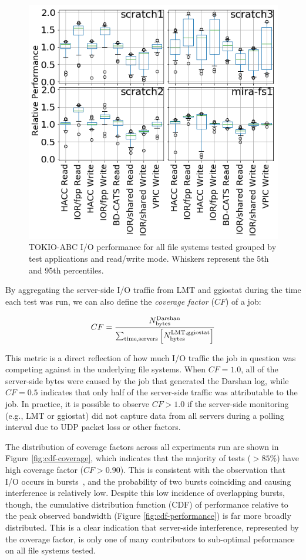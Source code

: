 \documentclass[conference,10pt,compsocconf]{IEEEtran}
\begin{document}
\begin{figure}[t]
\centering
\includegraphics[width=1.0\columnwidth]{figs/perf-boxplots.png}
\caption{TOKIO-ABC I/O performance for all file systems tested grouped by test
applications and read/write mode.  Whiskers represent the 5th and 95th
percentiles.}
\label{fig:tokio-abc-perf-boxplots}
\end{figure}

By aggregating the server-side I/O traffic from LMT and ggiostat during the time
each test was run, we can also define the \emph{coverage factor} ($CF$) of a
job:

\[ 
CF = \frac{N_{\textup{bytes}}^{\textup{Darshan}}}
{\sum_{\textup{time,servers}}^{ }
\left [ N_{\textup{bytes}}^{\textup{LMT,ggiostat}} \right ] }
\]

This metric is a direct reflection of how much I/O traffic the job in question
was competing against in the underlying file systems.  When $CF = 1.0$,
all of the server-side bytes were caused by the job that generated the Darshan
log, while $CF = 0.5$ indicates that only half of the server-side traffic was
attributable to the job.  In practice, it is possible to observe $CF > 1.0$ if
the server-side monitoring (e.g., LMT or ggiostat) did not capture data from all
servers during a polling interval due to UDP packet loss or other factors.

The distribution of coverage factors across all experiments run are shown in
Figure \ref{fig:cdf-coverage}, which indicates that the majority of tests
($> 85\%$) have high coverage factor ($ CF > 0.90 $).  This is consistent with
the observation that I/O occurs in bursts~\cite{Carns2011,Liu2016}, and the
probability of two bursts coinciding and causing interference is relatively
low.  Despite this low incidence of overlapping bursts, though, the cumulative
distribution function (CDF) of performance relative to the peak observed
bandwidth (Figure \ref{fig:cdf-performance}) is far more broadly distributed.
This is a clear indication that server-side interference, represented by the
coverage factor, is only one of many contributors to sub-optimal peformance on
all file systems tested.
\end{document}
